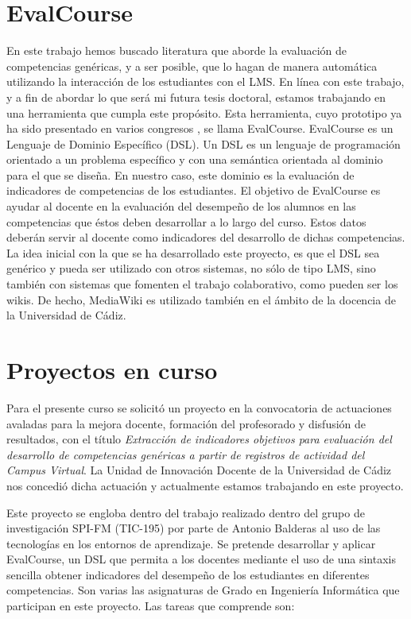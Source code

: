 \section{EvalCourse}
En este trabajo hemos buscado literatura que aborde la evaluación de competencias genéricas, y a ser posible, que lo hagan de manera automática utilizando la interacción de los estudiantes con el LMS. En línea con este trabajo, y a fin de abordar lo que será mi futura tesis doctoral, estamos trabajando en una herramienta que cumpla este propósito. Esta herramienta, cuyo prototipo ya ha sido presentado en varios congresos \cite{Balderas:2013,Balderas:2013a}, se llama EvalCourse. EvalCourse es un Lenguaje de Dominio Específico (DSL). Un DSL es un lenguaje de programación orientado a un problema específico y con una semántica orientada al dominio para el que se diseña. En nuestro caso, este dominio es la evaluación de indicadores de competencias de los estudiantes. El objetivo de EvalCourse es ayudar al docente en la evaluación del desempeño de los alumnos en las competencias que éstos deben desarrollar a lo largo del curso. Estos datos deberán servir al docente como indicadores del desarrollo de dichas competencias. La idea inicial con la que se ha desarrollado este proyecto, es que el DSL sea genérico y pueda ser utilizado con otros sistemas, no sólo de tipo LMS, sino también con sistemas que fomenten el trabajo colaborativo, como pueden ser los wikis. De hecho, MediaWiki es utilizado también en el ámbito de la docencia de la Universidad de Cádiz.

\section{Proyectos en curso}
Para el presente curso se solicitó un proyecto en la convocatoria de actuaciones avaladas para la mejora docente, formación del profesorado y disfusión de resultados, con el título \emph{Extracción de indicadores objetivos para evaluación del desarrollo de competencias genéricas a partir de registros de actividad del Campus Virtual}. La Unidad de Innovación Docente de la Universidad de Cádiz nos concedió dicha actuación y actualmente estamos trabajando en este proyecto.

Este proyecto se engloba dentro del trabajo realizado dentro del grupo de investigación SPI-FM (TIC-195) por parte de Antonio Balderas al uso de las tecnologías en los entornos de aprendizaje. Se pretende desarrollar y aplicar EvalCourse, un DSL que permita a los docentes mediante el uso de una sintaxis sencilla obtener indicadores del desempeño de los estudiantes en diferentes competencias. Son varias las asignaturas de Grado en Ingeniería Informática que participan en este proyecto. Las tareas que comprende son:

